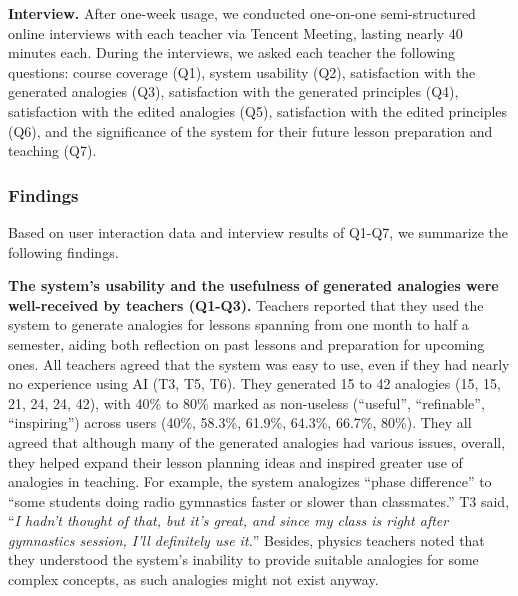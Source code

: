 \textbf{Interview.}
After one-week usage, we conducted one-on-one semi-structured online interviews with each teacher via Tencent Meeting, lasting nearly 40 minutes each. 
During the interviews, we asked each teacher the following questions: course coverage (Q1), system usability (Q2), satisfaction with the generated analogies (Q3), satisfaction with the generated principles (Q4), satisfaction with the edited analogies (Q5), satisfaction with the edited principles (Q6), and the significance of the system for their future lesson preparation and teaching (Q7).




\enlargethispage{10pt}


\subsubsection{Findings}
\label{sec:system_findings}
Based on user interaction data and interview results of Q1-Q7, we summarize the following findings.

\textbf{The system's usability and the usefulness of generated analogies were well-received by teachers (Q1-Q3).} 
Teachers reported that they used the system to generate analogies for lessons spanning from one month to half a semester, aiding both reflection on past lessons and preparation for upcoming ones. 
All teachers agreed that the system was easy to use, even if they had nearly no experience using AI (T3, T5, T6).
They generated 15 to 42 analogies (15, 15, 21, 24, 24, 42), with 40\% to 80\% marked as non-useless (``useful'', ``refinable'', ``inspiring'') across users (40\%, 58.3\%, 61.9\%, 64.3\%, 66.7\%, 80\%). 
They all agreed that although many of the generated analogies had various issues, overall, they helped expand their lesson planning ideas and inspired greater use of analogies in teaching.
For example, the system analogizes ``phase difference'' to ``some students doing radio gymnastics faster or slower than classmates.'' T3 said, ``\textit{I hadn’t thought of that, but it’s great, and since my class is right after gymnastics session, I’ll definitely use it.}''
Besides, physics teachers noted that they understood the system’s inability to provide suitable analogies for some complex concepts, as such analogies might not exist anyway.



